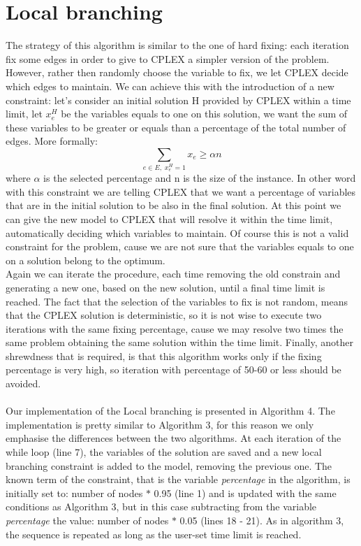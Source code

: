 \section{Local branching}
The strategy of this algorithm is similar to the one of hard fixing: each iteration fix some edges in order to give to CPLEX a simpler version of the problem. However, rather then randomly choose the variable to fix, we let CPLEX decide which edges to maintain. We can achieve this with the introduction of a new constraint: let's consider an initial solution H provided by CPLEX within a time limit, let $x_e^H$ be the variables equals to one on this solution, we want the sum of these variables to be greater or equals than a percentage of the total number of edges. More formally:
\begin{equation*}
	\sum_{e \in E, \; x_e^H = 1} x_e \geq \alpha n
\end{equation*}
where $\alpha$ is the selected percentage and n is the size of the instance. In other word with this constraint we are telling CPLEX that we want a percentage of variables that are in the initial solution to be also in the final solution. At this point we can give the new model to CPLEX that will resolve it within the time limit, automatically deciding which variables to maintain.
Of course this is not a valid constraint for the problem, cause we are not sure that the variables equals to one on a solution belong to the optimum.\\
Again we can iterate the procedure, each time removing the old constrain and generating a new one, based on the new solution, until a final time limit is reached. The fact that the selection of the variables to fix is not random, means that the CPLEX solution is deterministic, so it is not wise to execute two iterations with the same fixing percentage, cause we may resolve two times the same problem obtaining the same solution within the time limit.
Finally, another shrewdness that is required, is that this algorithm works only if the fixing percentage is very high, so iteration with percentage of 50-60 or less should be avoided. 
\\\\ Our implementation of the Local branching is presented in Algorithm 4. The implementation is pretty similar to Algorithm 3, for this reason we only emphasise the differences between the two algorithms. 
At each iteration of the while loop (line 7), the variables of the solution are saved and a new local branching constraint is added to the model, removing the previous one. The known term of the constraint, that is the variable \textit{percentage} in the algorithm, is initially set to: number of nodes $\ast$ 0.95 (line 1) and is updated with the same conditions as Algorithm 3, but in this case subtracting from the variable \textit{percentage} the value: number of nodes $\ast$ 0.05 (lines 18 - 21). As in algorithm 3, the sequence is repeated as long as the user-set time limit is reached.

